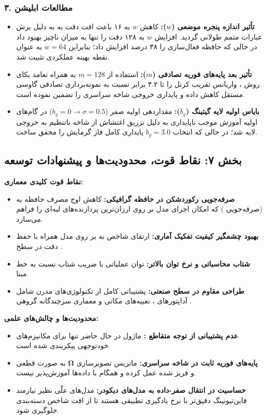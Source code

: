 \subsubsection*{۳. مطالعات ابلیشن }
\begin{itemize}
    \item \textbf{تأثیر اندازه پنجره موضعی ($w$):} کاهش $w$ به ۱۶ باعث افت دقت به  به دلیل برش عبارات متمم طولانی گردید. افزایش $w$ به ۱۲۸ دقت را تنها به میزان ناچیز  بهبود داد در حالی که حافظه فعال‌سازی را ۳۸ درصد افزایش داد؛ بنابراین $w=64$ به عنوان نقطه بهینه عملکردی تثبیت شد.
    \item \textbf{تأثیر بعد پایه‌های فوریه تصادفی ($m$):} استفاده از $m=128$ به همراه تعامد یکای روش ، واریانس تقریب کرنل را تا ۴.۲ برابر نسبت به نمونه‌برداری تصادفی گاوسی مستقل کاهش داده و پایداری خروجی شاخه سراسری را تضمین نموده است.
    \item \textbf{بایاس اولیه لایه گیتینگ ($b_g$):} مقداردهی اولیه صفر ($b_g = 0 \to \sigma = 0.5$) در گام‌های اولیه آموزش موجب ناپایداری به دلیل تزریق اغتشاش از شاخه ناتنظیم  به خروجی لایه شد؛ در حالی که انتخاب $b_g = 3.0$ پایداری کامل فاز گرمایش  را محقق ساخت.
\end{itemize}

\subsection*{بخش ۷: نقاط قوت، محدودیت‌ها و پیشنهادات توسعه }
\textbf{نقاط قوت کلیدی معماری:}
\begin{itemize}
    \item \textbf{صرفه‌جویی رکوردشکن در حافظه گرافیکی:} کاهش اوج مصرف حافظه به  (صرفه‌جویی ) که امکان اجرای مدل بر روی ارزان‌ترین پردازنده‌های لبه‌ای را فراهم می‌سازد.
    \item \textbf{بهبود چشمگیر کیفیت تفکیک آماری:} ارتقای شاخص  به  بر روی مدل  همراه با حفظ دقت در سطح .
    \item \textbf{شتاب محاسباتی و نرخ توان بالاتر:} توان عملیاتی  با ضریب شتاب  نسبت به خط مبنا.
    \item \textbf{طراحی مقاوم در سطح صنعتی:} پشتیبانی کامل از تکنولوژی‌های مدرن شامل آداپتورهای ، تعبیه‌های مکانی  و معماری سرچندگانه گروهی .
\end{itemize}

\textbf{محدودیت‌ها و چالش‌های علمی:}
\begin{itemize}
    \item \textbf{عدم پشتیبانی از توجه متقاطع :} ماژول در حال حاضر تنها برای مکانیزم‌های خودتوجهی  پیکربندی شده است.
    \item \textbf{پایه‌های فوریه ثابت در شاخه سراسری:} ماتریس تصویرسازی $\boldsymbol{\Omega}$ به صورت قطعی و فریز شده عمل کرده و همگام با داده‌ها آموزش‌پذیر نیست.
    \item \textbf{حساسیت در انتقال صفر-داده به مدل‌های دیکودر:} مدل‌های علّی نظیر  نیازمند فاین‌تیونینگ دقیق‌تر با نرخ یادگیری تطبیقی هستند تا از افت شاخص دسته‌بندی جلوگیری شود.
\end{itemize}

